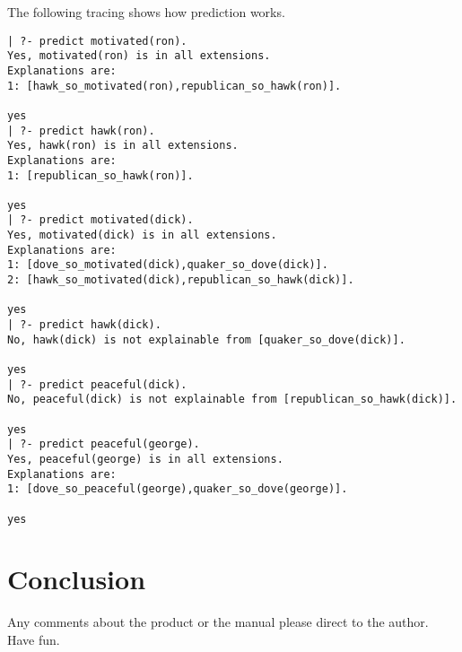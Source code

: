 The following tracing shows how prediction works.
\begin{verbatim}
| ?- predict motivated(ron).
Yes, motivated(ron) is in all extensions.
Explanations are:
1: [hawk_so_motivated(ron),republican_so_hawk(ron)].

yes
| ?- predict hawk(ron).
Yes, hawk(ron) is in all extensions.
Explanations are:
1: [republican_so_hawk(ron)].

yes
| ?- predict motivated(dick).
Yes, motivated(dick) is in all extensions.
Explanations are:
1: [dove_so_motivated(dick),quaker_so_dove(dick)].
2: [hawk_so_motivated(dick),republican_so_hawk(dick)].

yes
| ?- predict hawk(dick).
No, hawk(dick) is not explainable from [quaker_so_dove(dick)].

yes
| ?- predict peaceful(dick).
No, peaceful(dick) is not explainable from [republican_so_hawk(dick)].

yes
| ?- predict peaceful(george).
Yes, peaceful(george) is in all extensions.
Explanations are:
1: [dove_so_peaceful(george),quaker_so_dove(george)].
 
yes
\end{verbatim}
\section{Conclusion}
Any comments about the product or the manual please direct to the author.
Have fun.
